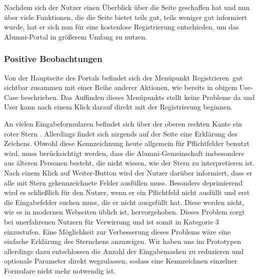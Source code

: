 Nachdem sich der Nutzer einen Überblick über die Seite geschaffen hat und nun über viele Funktionen, die die Seite
bietet teils gut, teils weniger gut informiert wurde, hat er sich nun für eine kostenlose Registrierung entschieden, um das Alumni-Portal in größerem Umfang zu nutzen.

\subsubsection*{Positive Beobachtungen}
Von der Hauptseite des Portals befindet sich der Menüpunkt \glqq Registrieren\grqq ~gut sichtbar zusammen mit einer Reihe anderer Aktionen,
wie bereits in obigem Use-Case beschrieben. Das Auffinden dieses Menüpunkts stellt keine Probleme da und User kann nach einem Klick darauf direkt mit der Registrierung
beginnen.


{ An vielen Eingabeformularen befindet sich über der oberen rechten Kante ein roter Stern \glqq *\grqq. Allerdings findet sich nirgends auf der Seite eine Erklärung des Zeichens.
Obwohl diese Kennzeichnung heute allgemein für Pflichtfelder benutzt wird, muss berücksichtigt werden, dass die Alumni-Gemeinschaft insbesondere aus älteren Personen besteht, die nicht wissen, wie der Stern zu interpretieren ist. Nach einem Klick auf \glqq Weiter\grqq -Button wird der Nutzer darüber informiert, dass er alle mit Stern gekennzeichnete Felder ausfüllen muss.
}
{ Besonders deprimierend wird es schließlich für den Nutzer, wenn er ein Pflichtfeld nicht ausfüllt und erst die Eingabefelder suchen muss, die er nicht ausgefüllt hat. Diese werden nicht, wie es in modernen Webseiten üblich ist, hervorgehoben. Dieses Problem sorgt bei unerfahrenen Nutzern für Verwirrung und ist somit in Kategorie 3 einzustufen.
}
{ Eine Möglichkeit zur Verbesserung dieses Problems wäre eine einfache Erklärung des Sternchens anzuzeigen. Wir haben uns im Prototypen allerdings dazu entschlossen die Anzahl der Eingabemasken zu reduzieren und optionale Parameter direkt wegzulassen, sodass eine Kennzeichnen einzelner Formulare nicht mehr notwendig ist.
}

